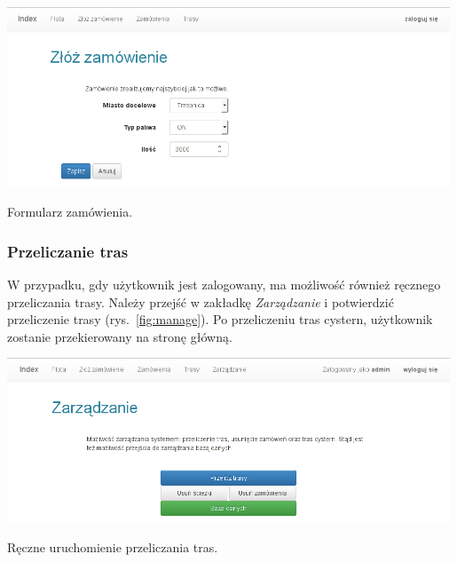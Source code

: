 \documentclass[11pt,a4paper,oneside]{mwart}
\begin{document}
\begin{wykres}[htbp]
  \centering
  \includegraphics[width=0.99\textwidth]{pics/order_form.png}
  \caption{Formularz zamówienia.}
  \label{fig:order_form}
\end{wykres}

\subsubsection{Przeliczanie tras}
W przypadku, gdy użytkownik jest zalogowany, ma możliwość również ręcznego przeliczania trasy. Należy przejść w zakładkę \emph{Zarządzanie} i potwierdzić przeliczenie trasy (rys.~\ref{fig:manage}). Po przeliczeniu tras cystern, użytkownik zostanie przekierowany na stronę główną.
\begin{wykres}[htbp]
  \centering
  \includegraphics[width=0.99\textwidth]{pics/manage.png}
  \caption{Ręczne uruchomienie przeliczania tras.}
  \label{fig:manage}
\end{wykres}
\end{document}
